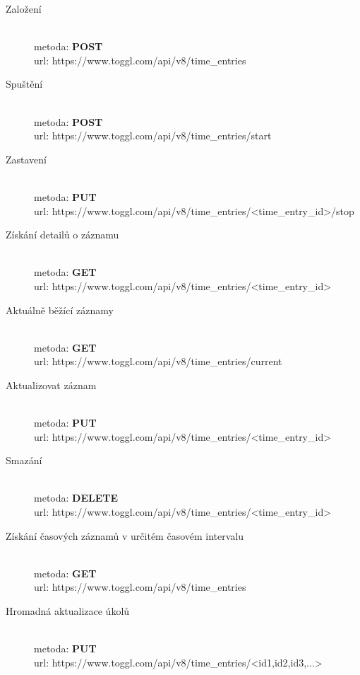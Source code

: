 \documentclass[thesis=B,czech]{FITthesis}[2012/06/26]
\begin{document}
\begin{description}
	\item[Založení] \hspace*{\fill} \\
	 metoda: \textbf{POST} \\
	 url: https://www.toggl.com/api/v8/time\_entries 
	 	 
	\item[Spuštění] \hspace*{\fill} \\
	 metoda: \textbf{POST} \\
	 url: https://www.toggl.com/api/v8/time\_entries/start \\
	 
	\item[Zastavení] \hspace*{\fill} \\
	metoda: \textbf{PUT} \\
	url: https://www.toggl.com/api/v8/time\_entries/<time\_entry\_id>/stop
	
	\item[Získání detailů o záznamu] \hspace*{\fill} \\
	metoda: \textbf{GET} \\
	url: https://www.toggl.com/api/v8/time\_entries/<time\_entry\_id>
		
	\item[Aktuálně běžící záznamy] \hspace*{\fill} \\
	metoda: \textbf{GET} \\
	url: https://www.toggl.com/api/v8/time\_entries/current
	
	\item[Aktualizovat záznam] \hspace*{\fill} \\
	metoda: \textbf{PUT} \\
	url: https://www.toggl.com/api/v8/time\_entries/<time\_entry\_id>
	
	\item[Smazání] \hspace*{\fill} \\
	metoda: \textbf{DELETE} \\
	url: https://www.toggl.com/api/v8/time\_entries/<time\_entry\_id>
	
	\item[Získání časových záznamů v určitém časovém intervalu] \hspace*{\fill} \\
	metoda: \textbf{GET} \\
	url: https://www.toggl.com/api/v8/time\_entries
	
	\item[Hromadná aktualizace úkolů] \hspace*{\fill} \\
	metoda: \textbf{PUT} \\
	url: https://www.toggl.com/api/v8/time\_entries/<id1,id2,id3,...>
	
	
		
\end{description}
\end{document}
